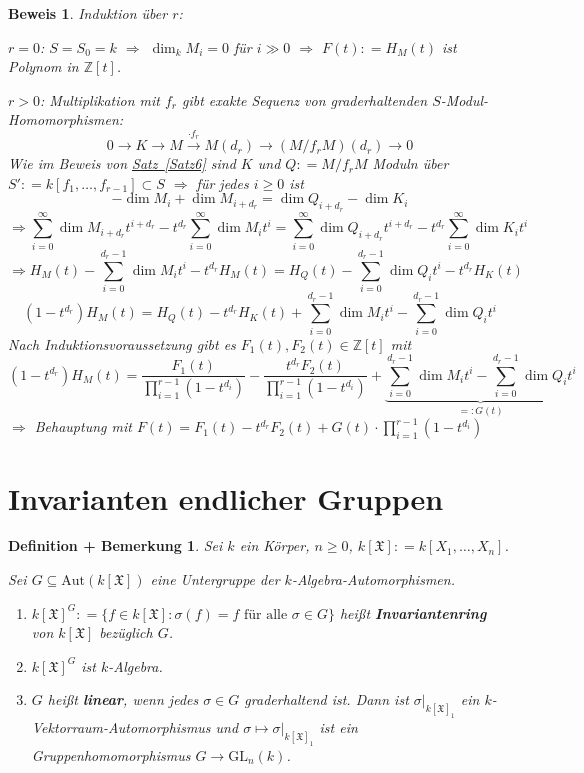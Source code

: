 \documentclass[a4paper,12pt]{scrbook}
\theoremstyle{break}
\newtheorem{DefBem}[Def]{Definition + Bemerkung}
\theoremstyle{nonumberbreak}
\newtheorem{Bew}{Beweis}
\theoremstyle{nonumberplain}
\newcommand{\emp}[1]{\textbf{\emph{#1}}}
\newcommand{\defeqr}[0]{\mathrel{\mathop:}=}
\newcommand{\myref}[2]{%
\hyperref[#2]{#1~\ref*{#2}}%
}
\begin{document}
\begin{Bew}
  Induktion über $r$:

  $r=0$: $S = S_0 = k$ $\Rightarrow$ $\dim_k M_i = 0$ für $i \gg 0$
  $\Rightarrow$ $F(t) \defeqr H_M(t)$ ist Polynom in $\mathbb{Z}[t]$.

  $r>0$: Multiplikation mit $f_r$ gibt exakte Sequenz von graderhaltenden
  $S$-Modul-Homomorphismen:
  $$0 \to K \to M \overset{\cdot f_r}{\to} M(d_r) \to (M/f_r M)(d_r) \to 0$$
  Wie im Beweis von \myref{Satz}{Satz6} sind $K$ und $Q \defeqr M/f_r M$ Moduln
  über $S' \defeqr k[f_1, \dots, f_{r-1}] \subset S$ $\Rightarrow$ für jedes $i
  \ge 0$ ist
  $$ -\dim M_i + \dim M_{i + d_r} = \dim Q_{i+d_r} - \dim K_i$$
  $$\Rightarrow \sum_{i=0}^{\infty} \dim M_{i+d_r} t^{i+d_r} - t^{d_r}
  \sum_{i=0}^{\infty} \dim M_i t^i = \sum_{i=0}^{\infty} \dim
  Q_{i+d_r} t^{i+d_r} - t^{d_r} \sum_{i=0}^{\infty} \dim K_i t^i$$
  $$\Rightarrow H_M(t) - \sum_{i=0}^{d_r -1} \dim M_i t^i - t^{d_r} H_M(t)
  = H_Q(t) - \sum_{i=0}^{d_r - 1} \dim Q_i t^i - t^{d_r} H_K(t)$$
  $$(1 - t^{d_r})H_M(t) = H_Q(t) - t^{d_r} H_K(t) + \sum_{i=0}^{d_r-1} \dim M_i t^i - \sum_{i=0}^{d_r - 1} \dim Q_i t^i$$
  Nach Induktionsvoraussetzung gibt es $F_1(t), F_2(t) \in \mathbb{Z}[t]$ mit
  $$(1-t^{d_r})H_M(t)= \frac{F_1(t)}{\prod_{i=1}^{r-1}(1-t^{d_i})} - \frac{t^{d_r} F_2(t)}{\prod_{i=1}^{r-1}(1-t^{d_i})} +
  \underbrace{\sum_{i=0}^{d_r-1} \dim M_i t^i - \sum_{i=0}^{d_r - 1} \dim Q_i t^i}_{=: G(t)}$$
  $\Rightarrow$ Behauptung mit $F(t) = F_1(t) - t^{d_r}F_2(t) + G(t)\cdot \displaystyle\prod_{i=1}^{r-1}(1-t^{d_i})$
\end{Bew}
\section{Invarianten endlicher Gruppen}

\begin{DefBem}
\label{2.19}
  Sei $k$ ein Körper, $n \ge 0$, $k[\mathfrak{X}] \defeqr k[X_1, \dots, X_n]$.

  Sei $G \subseteq \mbox{Aut}(k[\mathfrak{X}])$ eine Untergruppe der $k$-Algebra-Automorphismen.
  \begin{enumerate}
    \item $k[\mathfrak{X}]^G \defeqr \{f \in k[\mathfrak{X}]: \sigma (f) = f \mbox{ für alle } \sigma
          \in G\}$ heißt \emp{Invariantenring} von $k[\mathfrak{X}]$
          bezüglich $G$.
    \item $k[\mathfrak{X}]^G$ ist $k$-Algebra.
    \item $G$ heißt \emp{linear}, wenn jedes $\sigma \in G$ graderhaltend ist. Dann
          ist $\sigma|_{k[\mathfrak{X}]_1}$ ein $k$-Vektorraum-Automorphismus und $\sigma \mapsto
          \sigma|_{k[\mathfrak{X}]_1}$ ist ein Gruppenhomomorphismus $G \to \text{GL}_n(k)$.
  \end{enumerate}
\end{DefBem}
\end{document}
